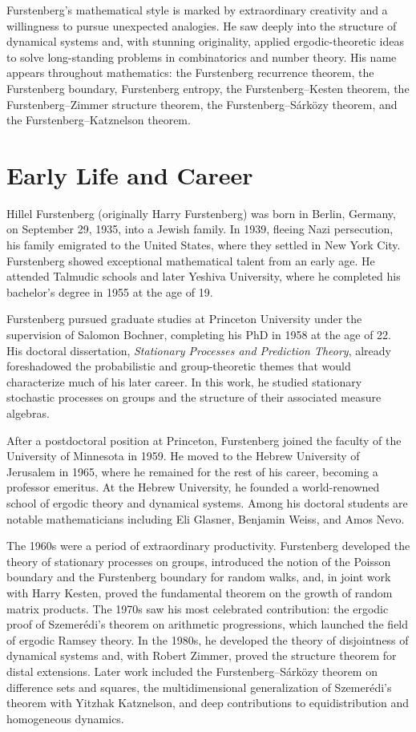 Furstenberg's mathematical style is marked by extraordinary creativity and a willingness to pursue unexpected analogies. He saw deeply into the structure of dynamical systems and, with stunning originality, applied ergodic-theoretic ideas to solve long-standing problems in combinatorics and number theory. His name appears throughout mathematics: the Furstenberg recurrence theorem, the Furstenberg boundary, Furstenberg entropy, the Furstenberg--Kesten theorem, the Furstenberg--Zimmer structure theorem, the Furstenberg--S\'ark\"ozy theorem, and the Furstenberg--Katznelson theorem.

\section{Early Life and Career}

Hillel Furstenberg (originally Harry Furstenberg) was born in Berlin, Germany, on September 29, 1935, into a Jewish family. In 1939, fleeing Nazi persecution, his family emigrated to the United States, where they settled in New York City. Furstenberg showed exceptional mathematical talent from an early age. He attended Talmudic schools and later Yeshiva University, where he completed his bachelor's degree in 1955 at the age of 19.

Furstenberg pursued graduate studies at Princeton University under the supervision of Salomon Bochner, completing his PhD in 1958 at the age of 22. His doctoral dissertation, \textit{Stationary Processes and Prediction Theory}, already foreshadowed the probabilistic and group-theoretic themes that would characterize much of his later career. In this work, he studied stationary stochastic processes on groups and the structure of their associated measure algebras.

After a postdoctoral position at Princeton, Furstenberg joined the faculty of the University of Minnesota in 1959. He moved to the Hebrew University of Jerusalem in 1965, where he remained for the rest of his career, becoming a professor emeritus. At the Hebrew University, he founded a world-renowned school of ergodic theory and dynamical systems. Among his doctoral students are notable mathematicians including Eli Glasner, Benjamin Weiss, and Amos Nevo.

The 1960s were a period of extraordinary productivity. Furstenberg developed the theory of stationary processes on groups, introduced the notion of the Poisson boundary and the Furstenberg boundary for random walks, and, in joint work with Harry Kesten, proved the fundamental theorem on the growth of random matrix products. The 1970s saw his most celebrated contribution: the ergodic proof of Szemer\'edi's theorem on arithmetic progressions, which launched the field of ergodic Ramsey theory. In the 1980s, he developed the theory of disjointness of dynamical systems and, with Robert Zimmer, proved the structure theorem for distal extensions. Later work included the Furstenberg--S\'ark\"ozy theorem on difference sets and squares, the multidimensional generalization of Szemer\'edi's theorem with Yitzhak Katznelson, and deep contributions to equidistribution and homogeneous dynamics.

